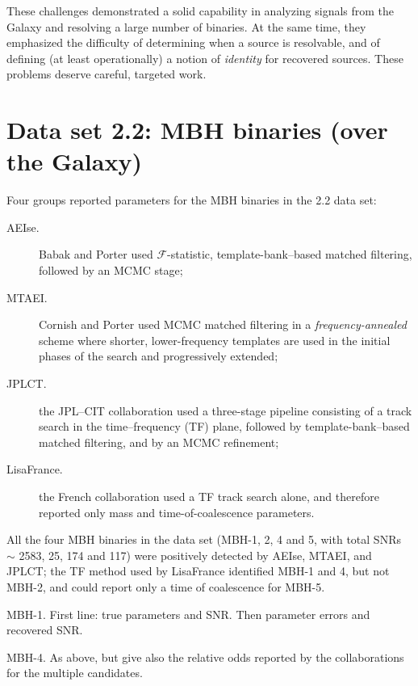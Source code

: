 \documentclass{iopart}
\begin{document}
These challenges demonstrated a solid capability in analyzing signals from the Galaxy and resolving a large number of binaries. At the same time, they emphasized the difficulty of determining when a source is resolvable, and of defining (at least operationally) a notion of \emph{identity} for recovered sources. These problems deserve careful, targeted work.

\section{Data set 2.2: MBH binaries (over the Galaxy)}

Four groups reported parameters for the MBH binaries in the 2.2 data set:
\begin{description} 
\item[AEIse.] Babak and Porter used $\mathcal{F}$-statistic, template-bank--based matched filtering, followed by an MCMC stage;
\item[MTAEI.] Cornish and Porter used MCMC matched filtering in a \emph{frequency-annealed} scheme where shorter, lower-frequency templates are used in the initial phases of the search and progressively extended;
\item[JPLCT.] the JPL--CIT collaboration used a three-stage pipeline consisting of a track search in the time--frequency (TF) plane, followed by template-bank--based matched filtering, and by an MCMC refinement;
\item[LisaFrance.] the French collaboration used a TF track search alone, and therefore reported only mass and time-of-coalescence parameters.
\end{description}
All the four MBH binaries in the data set (MBH-1, 2, 4 and 5, with total SNRs $\sim$ 2583, 25, 174 and 117) were positively detected by AEIse, MTAEI, and JPLCT; the TF method used by LisaFrance identified MBH-1 and 4, but not MBH-2, and could report only a time of coalescence for MBH-5.
%
\begin{table}
MBH-1. First line: true parameters and SNR. Then parameter errors and recovered SNR.
\caption{\label{tab:mbh1}}
\end{table}
%
\begin{table}
MBH-4. As above, but give also the relative odds reported by the collaborations for the multiple candidates.
\caption{\label{tab:mbh4}}
\end{table}
\end{document}
